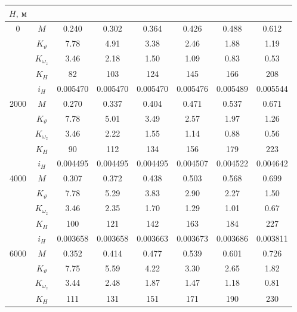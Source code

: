 \begin{tabular}{|c|c|c|c|c|c|c|c|}
\hline
$H,\ м$ & \multicolumn{7}{c|}{}\\\hline

0 & $M$ &     0.240 &     0.302 &     0.364 &     0.426 &     0.488 &     0.612 \\
      & $K_\vartheta$ &      7.78 &      4.91 &      3.38 &      2.46 &      1.88 &      1.19 \\
      & $K_{\omega_z}$ &      3.46 &      2.18 &      1.50 &      1.09 &      0.83 &      0.53 \\
      & $K_H$ &        82 &       103 &       124 &       145 &       166 &       208 \\
      & $i_H$ &  0.005470 &  0.005470 &  0.005470 &  0.005476 &  0.005489 &  0.005544 \\\hline
2000 & $M$ &     0.270 &     0.337 &     0.404 &     0.471 &     0.537 &     0.671 \\
      & $K_\vartheta$ &      7.78 &      5.01 &      3.49 &      2.57 &      1.97 &      1.26 \\
      & $K_{\omega_z}$ &      3.46 &      2.22 &      1.55 &      1.14 &      0.88 &      0.56 \\
      & $K_H$ &        90 &       112 &       134 &       156 &       179 &       223 \\
      & $i_H$ &  0.004495 &  0.004495 &  0.004495 &  0.004507 &  0.004522 &  0.004642 \\\hline
4000 & $M$ &     0.307 &     0.372 &     0.438 &     0.503 &     0.568 &     0.699 \\
      & $K_\vartheta$ &      7.78 &      5.29 &      3.83 &      2.90 &      2.27 &      1.50 \\
      & $K_{\omega_z}$ &      3.46 &      2.35 &      1.70 &      1.29 &      1.01 &      0.67 \\
      & $K_H$ &       100 &       121 &       142 &       163 &       184 &       227 \\
      & $i_H$ &  0.003658 &  0.003658 &  0.003663 &  0.003673 &  0.003686 &  0.003811 \\\hline
6000 & $M$ &     0.352 &     0.414 &     0.477 &     0.539 &     0.601 &     0.726 \\
      & $K_\vartheta$ &      7.75 &      5.59 &      4.22 &      3.30 &      2.65 &      1.82 \\
      & $K_{\omega_z}$ &      3.44 &      2.48 &      1.87 &      1.47 &      1.18 &      0.81 \\
      & $K_H$ &       111 &       131 &       151 &       171 &       190 &       230 \\

\end{tabular}
